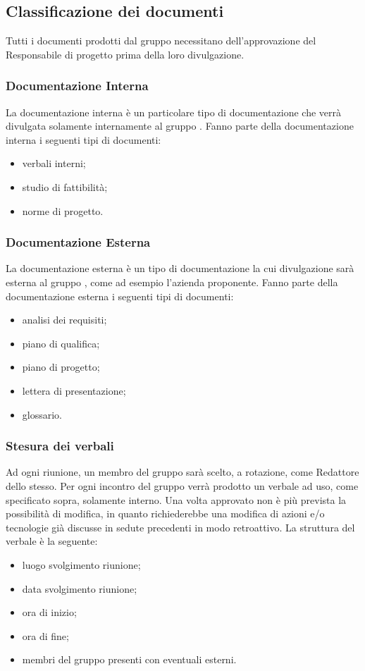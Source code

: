 \subsection{Classificazione dei documenti}
Tutti i documenti prodotti dal gruppo {\Gruppo} necessitano dell’approvazione del Responsabile di progetto prima della loro divulgazione.

\subsubsection{Documentazione Interna}
La documentazione interna è un particolare tipo di documentazione che verrà divulgata solamente internamente al gruppo {\Gruppo}. Fanno parte della documentazione interna i seguenti tipi di documenti:
\begin{itemize}
	\item verbali interni;
	\item studio di fattibilità;
	\item norme di progetto.
\end{itemize}

\subsubsection{Documentazione Esterna}
La documentazione esterna è un tipo di documentazione la cui divulgazione sarà esterna al gruppo {\Gruppo}, come ad esempio l'azienda proponente. Fanno parte della documentazione esterna i seguenti tipi di documenti:
\begin{itemize}
	\item analisi dei requisiti;
	\item piano di qualifica;
	\item piano di progetto;
	\item lettera di presentazione;
	\item glossario.
\end{itemize}

\subsubsection{Stesura dei verbali}
Ad ogni riunione, un membro del gruppo {\Gruppo} sarà scelto, a rotazione, come Redattore dello stesso. Per ogni incontro del gruppo verrà prodotto un verbale ad uso, come specificato sopra, solamente interno. Una volta approvato non è più prevista la possibilità di modifica, in quanto richiederebbe una modifica di azioni e/o tecnologie già discusse in sedute precedenti in modo retroattivo. La struttura del verbale è la seguente:
\begin{itemize}
	\item luogo svolgimento riunione;
	\item data svolgimento riunione;
	\item ora di inizio;
	\item ora di fine;
	\item membri del gruppo presenti con eventuali esterni.
\end{itemize}

